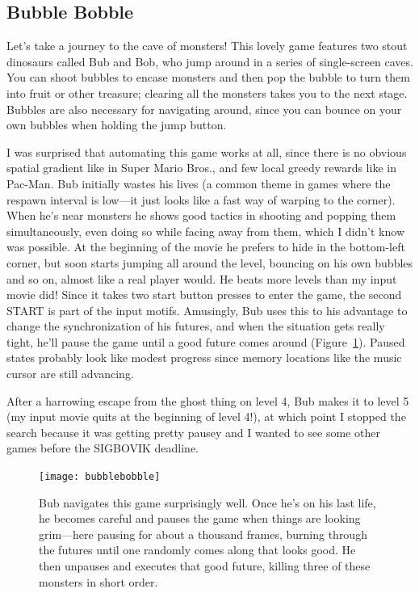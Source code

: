 \documentclass[twocolumn]{article}
\begin{document}
\subsection{Bubble Bobble} \label{sec:bubblebobble}

Let's take a journey to the cave of monsters! This lovely game
features two stout dinosaurs called Bub and Bob, who jump around in a
series of single-screen caves. You can shoot bubbles to encase
monsters and then pop the bubble to turn them into fruit or other
treasure; clearing all the monsters takes you to the next stage.
Bubbles are also necessary for navigating around, since you can bounce
on your own bubbles when holding the jump button.

I was surprised that automating this game works at all, since there is
no obvious spatial gradient like in Super Mario Bros., and few local
greedy rewards like in Pac-Man. Bub initially wastes his lives (a
common theme in games where the respawn interval is low---it just
looks like a fast way of warping to the corner). When he's near
monsters he shows good tactics in shooting and popping them
simultaneously, even doing so while facing away from them, which I
didn't know was possible. At the beginning of the movie he prefers to
hide in the bottom-left corner, but soon starts jumping all around the
level, bouncing on his own bubbles and so on, almost like a real
player would. He beats more levels than my input movie did! Since it
takes two start button presses to enter the game, the second START is
part of the input motifs. Amusingly, Bub uses this to his advantage to
change the synchronization of his futures, and when the situation gets
really tight, he'll pause the game until a good future comes around
(Figure~\ref{fig:bubblebobble}). Paused states probably look like
modest progress since memory locations like the music cursor are still
advancing.

After a harrowing escape from the ghost thing on level 4, Bub makes it
to level 5 (my input movie quits at the beginning of level 4!), at
which point I stopped the search because it was getting pretty pausey
and I wanted to see some other games before the SIGBOVIK deadline.

\begin{figure}[ht]
\begin{center}
\texttt{[image: bubblebobble]}
\end{center}\vspace{-0.1in}
\caption{Bub navigates this game surprisingly well. Once he's on his
  last life, he becomes careful and pauses the game when things are
  looking grim---here pausing for about a thousand frames, burning
  through the futures until one randomly comes along that looks good.
  He then unpauses and executes that good future, killing three of
  these monsters in short order.}
\label{fig:bubblebobble}
\end{figure}
\end{document}
